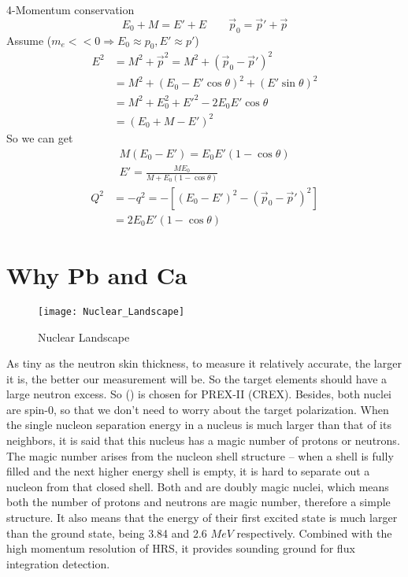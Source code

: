 4-Momentum conservation 
$$ E_0 + M = E' + E \qquad \vec{p}_0 = \vec{p}' + \vec{p} $$
Assume ($m_e << 0 \Rightarrow E_0 \approx p_0, E' \approx p'$)
\begin{equation}
    \begin{aligned}
	E^2 &= M^2 + \vec{p}^2 = M^2 + (\vec{p}_0 - \vec{p}')^2  \\
	    &= M^2 + (E_0 - E'\cos\theta)^2 + (E'\sin\theta)^2	\\
	    &= M^2 + E_0^2 + E'^2 - 2E_0E'\cos\theta	\\
	    &= (E_0 + M - E')^2
    \end{aligned}
\end{equation}
So we can get
\begin{equation}
    \begin{gathered}
	M(E_0 - E') = E_0E'(1-\cos\theta)   \\ 
	E' = \frac{ME_0}{M + E_0(1-\cos\theta)}
    \end{gathered}
    \label{eq:scattered_energy}
\end{equation}
\begin{equation}
    \begin{aligned}
	Q^2 &= -q^2 = -[(E_0 - E')^2 - (\vec{p}_0 - \vec{p}')^2]    \\
	    &= 2E_0E'(1-\cos\theta)
    \end{aligned}
    \label{eq:Q2}
\end{equation}

\section{Why Pb and Ca}
\begin{figure}
    \centering
    \texttt{[image: Nuclear\_Landscape]}
    \caption{Nuclear Landscape}
    \label{fig:nuclear_landscape}
\end{figure}
As tiny as the neutron skin thickness, to measure it relatively accurate, the
larger it is, the better our measurement will be. So the target elements should
have a large neutron excess. So \Pb (\Ca) is chosen for PREX-II (CREX). Besides,
both nuclei are spin-0, so that we don't need to worry about the target 
polarization.
When the single nucleon separation energy in a nucleus is much larger than that of
its neighbors, it is said that this nucleus has a magic number of protons or
neutrons. The magic number arises from the nucleon shell structure -- when 
a shell is fully filled and the next higher energy shell is empty, it is hard
to separate out a nucleon from that closed shell.
Both \Ca and \Pb are doubly magic nuclei, which means both the number of protons
and neutrons are magic number, therefore a simple structure. 
It also means that the energy of their first 
excited state is much larger than the ground state, being 3.84 and 2.6 $MeV$ 
respectively. Combined with the high momentum resolution of HRS, it provides
sounding ground for flux integration detection.

